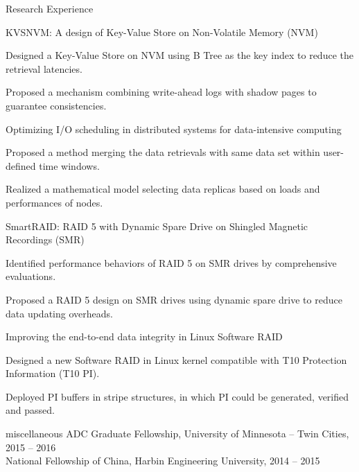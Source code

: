 \documentclass{resume} %
\begin{document}
\begin{rSection}{Research Experience}

\begin{lSubsection}{KVSNVM: A design of Key-Value Store on Non-Volatile Memory (NVM)}
\item Designed a Key-Value Store on NVM using B Tree as the key index to reduce the retrieval latencies.
\item Proposed a mechanism combining write-ahead logs with shadow pages to guarantee consistencies.
\end{lSubsection}

\begin{lSubsection}{Optimizing I/O scheduling in distributed systems for data-intensive computing}
\item Proposed a method merging the data retrievals with same data set within user-defined time windows.
\item Realized a mathematical model selecting data replicas based on loads and performances of nodes.
\end{lSubsection}

\begin{lSubsection}{SmartRAID: RAID 5 with Dynamic Spare Drive on Shingled Magnetic Recordings (SMR)}
\item Identified performance behaviors of RAID 5 on SMR drives by comprehensive evaluations.
\item Proposed a RAID 5 design on SMR drives using dynamic spare drive to reduce data updating overheads.
\end{lSubsection}

\begin{lSubsection}{Improving the end-to-end data integrity in Linux Software RAID}
\item Designed a new Software RAID in Linux kernel compatible with T10 Protection Information (T10 PI).
\item Deployed PI buffers in stripe structures, in which PI could be generated, verified and passed.
\end{lSubsection}

\end{rSection}

\begin{rSection}{miscellaneous}
ADC Graduate Fellowship, University of Minnesota -- Twin Cities, 2015 -- 2016\\
National Fellowship of China, Harbin Engineering University, 2014 -- 2015
\end{rSection}

\end{document}
